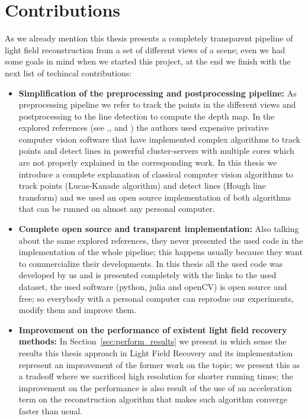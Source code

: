 \section{Contributions}

As we already mention this thesis presents a completely transparent pipeline of light field reconstruction from a set of different views of a scene; even we had some goals in mind when we started this project, at the end we finish with the next list of techincal contributions:

\begin{itemize}
\item \textbf{Simplification of the preprocessing and postprocessing pipeline:} As preprocessing pipeline we refer to track the points in the different views and postprocessing to the line detection to compute the depth map. In the explored references (see \cite{Bolles},\cite{LF-Shearlets}, \cite{Kim-Disney} and \cite{CompressedMIT}) the authors used expensive privative computer vision software that have implemented complex algorithms to track points and detect lines in powerful cluster-servers with multiple cores which are not properly explained in the corresponding work. In this thesis we introduce a complete explanation of classical computer vision algorithms to track points (Lucas-Kanade algorithm) and detect lines (Hough line transform) and we used an open source implementation of both algorithms that can be runned on almost any personal computer.

\item \textbf{Complete open source and transparent implementation:} Also talking about the same explored references, they never presented the used code in the implementation of the whole pipeline; this happens usually because they want to commercialize their developments. In this thesis all the used code was developed by us and is presented completely with the links to the used dataset, the used software (python, julia and openCV) is open source and free; so everybody with a personal computer can reprodue our experiments, modify them and improve them.

\item \textbf{Improvement on the performance of existent light field recovery methods:} In Section~\ref{sec:perform_results} we present in which sense the results this thesis approach in Light Field Recovery and its implementation represent an improvement of the former work on the topic; we present this as a tradeoff where we sacrificed high resolution for shorter running times; the improvement on the performance is also result of the use of an acceleration term on the reconstruction algorithm that makes such algorithm converge faster than usual. 

\end{itemize}


